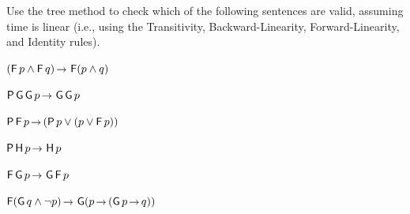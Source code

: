 \begin{exercise}
  Use the tree method to check which of the following sentences are valid,
  assuming time is linear (i.e., using the Transitivity, Backward-Linearity,
  Forward-Linearity, and Identity rules).
  \begin{exlist}
  \item $(\tF p \land \tF q) \to \tF(p \land q)$
  \item $\tP\tG\tG p \to \tG\tG p$
  \item $\tP\tF p \to (\tP p \lor (p \lor \tF p))$
  \item $\tP\tH p \to \tH p$
  \item $\tF\tG p \to \tG\tF p$
  \item $\tF (\tG q \land \neg p) \to \tG(p \to (\tG p \to q))$ 
  \end{exlist}
\end{exercise}
